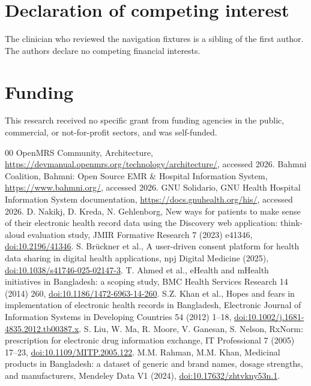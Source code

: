 \documentclass[preprint,12pt,a4paper]{elsarticle}
\begin{document}
\section*{Declaration of competing interest}
The clinician who reviewed the navigation fixtures is a sibling of the first author.
The authors declare no competing financial interests.

\section*{Funding}
This research received no specific grant from funding agencies in the public,
commercial, or not-for-profit sectors, and was self-funded.

\begin{thebibliography}{00}
 OpenMRS Community, Architecture, \url{https://devmanual.openmrs.org/technology/architecture/}, accessed 2026.
 Bahmni Coalition, Bahmni: Open Source EMR \& Hospital Information System, \url{https://www.bahmni.org/}, accessed 2026.
 GNU Solidario, GNU Health Hospital Information System documentation, \url{https://docs.gnuhealth.org/his/}, accessed 2026.
 D. Nakikj, D. Kreda, N. Gehlenborg, New ways for patients to make sense of their electronic health record data using the Discovery web application: think-aloud evaluation study, JMIR Formative Research 7 (2023) e41346, \href{https://doi.org/10.2196/41346}{doi:10.2196/41346}.
 S. Br\"uckner et al., A user-driven consent platform for health data sharing in digital health applications, npj Digital Medicine (2025), \href{https://doi.org/10.1038/s41746-025-02147-3}{doi:10.1038/s41746-025-02147-3}.
 T. Ahmed et al., eHealth and mHealth initiatives in Bangladesh: a scoping study, BMC Health Services Research 14 (2014) 260, \href{https://doi.org/10.1186/1472-6963-14-260}{doi:10.1186/1472-6963-14-260}.
 S.Z. Khan et al., Hopes and fears in implementation of electronic health records in Bangladesh, Electronic Journal of Information Systems in Developing Countries 54 (2012) 1--18, \href{https://doi.org/10.1002/j.1681-4835.2012.tb00387.x}{doi:10.1002/j.1681-4835.2012.tb00387.x}.
 S. Liu, W. Ma, R. Moore, V. Ganesan, S. Nelson, RxNorm: prescription for electronic drug information exchange, IT Professional 7 (2005) 17--23, \href{https://doi.org/10.1109/MITP.2005.122}{doi:10.1109/MITP.2005.122}.
 M.M. Rahman, M.M. Khan, Medicinal products in Bangladesh: a dataset of generic and brand names, dosage strengths, and manufacturers, Mendeley Data V1 (2024), \href{https://doi.org/10.17632/zhtvkny53n.1}{doi:10.17632/zhtvkny53n.1}.

\end{thebibliography}
\end{document}

